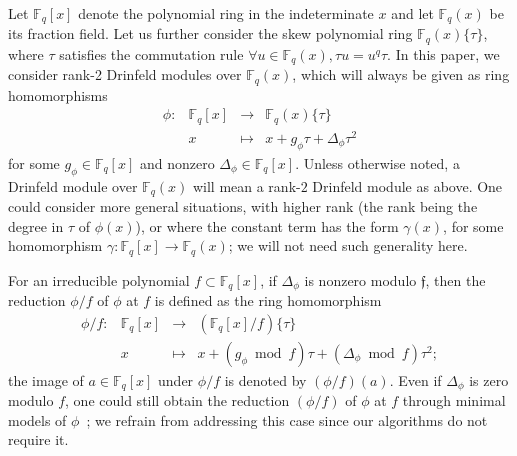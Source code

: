 \documentclass[12pt]{article}
\theoremstyle{plain}
\theoremstyle{definition}
\newcommand{\ang}[1]{\{#1\}}
\def\F{\ensuremath{\mathbb{F}}}
\newcommand{\f}{\mathfrak f}
\begin{document}
Let $\F_q[x]$ denote the polynomial ring in the indeterminate $x$ and
let $\F_q(x)$ be its fraction field.  Let us further consider the skew
polynomial ring $\F_q(x)\ang{\tau}$, where $\tau$ satisfies
the commutation rule $\forall u \in \F_q(x), \tau u = u^q \tau$.  In
this paper, we consider rank-2 Drinfeld modules over $\F_q(x)$,
which will always be given
as ring homomorphisms
\[
\begin{array}{rclc}
	\phi : & \F_q[x] & \longrightarrow & \F_q(x)\ang{\tau} \\
	& x & \longmapsto & x + g_\phi \tau + \Delta_\phi \tau^2	
\end{array}
\]
for some $g_\phi \in \F_q[x]$ and nonzero $\Delta_\phi \in
\F_q[x]$. Unless otherwise noted, a Drinfeld module over $\F_q(x)$
will mean a rank-$2$ Drinfeld module as above. One could consider more
general situations, with higher rank (the rank being the degree in
$\tau$ of $\phi(x)$), or where the constant term has the form
$\gamma(x)$, for some homomorphism $\gamma: \F_q[x] \to \F_q(x)$;
we will not need such generality here.



For an irreducible polynomial $f \subset \F_q[x]$, if $\Delta_\phi$ is
nonzero modulo $\f$, then the reduction $\phi/f$ of $\phi$ at $f$ is defined as the ring homomorphism
\[
\begin{array}{rclc}
	\phi/f : & \F_q[x] & \longrightarrow & (\F_q[x]/f) \ang{\tau} \\
	& x & \longmapsto & x + (g_\phi \bmod f) \tau + (\Delta_\phi\bmod f) \tau^2;
\end{array}
\]
 the image of $a \in \F_q[x]$ under $\phi/f$ is denoted by
$(\phi/f)(a)$. Even if $\Delta_{\phi}$ is zero modulo $f$, one could
still obtain the reduction $(\phi/f)$ of $\phi$ at $f$ through
minimal models of $\phi$~\cite{gek1}; we refrain from
addressing this case since our algorithms do not require it.
\end{document}
